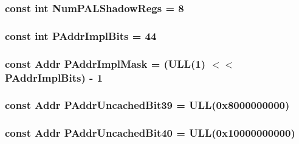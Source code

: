 \label{namespaceAlphaISA_a568d4aa96dd7cd963f3b1b1b0446c9c6}
\hypertarget{namespaceAlphaISA_a28eb16586861c2678813557695525732}{
\subsubsection[{NumPALShadowRegs}]{\setlength{\rightskip}{0pt plus 5cm}const int {\bf NumPALShadowRegs} = 8}}
\label{namespaceAlphaISA_a28eb16586861c2678813557695525732}
\hypertarget{namespaceAlphaISA_a524d6a2c6c70550904ff8fbcd015d6ec}{
\subsubsection[{PAddrImplBits}]{\setlength{\rightskip}{0pt plus 5cm}const int {\bf PAddrImplBits} = 44}}
\label{namespaceAlphaISA_a524d6a2c6c70550904ff8fbcd015d6ec}
\hypertarget{namespaceAlphaISA_abb8b7685b079953e35015543262458e2}{
\subsubsection[{PAddrImplMask}]{\setlength{\rightskip}{0pt plus 5cm}const {\bf Addr} {\bf PAddrImplMask} = (ULL(1) $<$$<$ {\bf PAddrImplBits}) -\/ 1}}
\label{namespaceAlphaISA_abb8b7685b079953e35015543262458e2}
\hypertarget{namespaceAlphaISA_ac10235dc75b856834b31439d8e250374}{
\subsubsection[{PAddrUncachedBit39}]{\setlength{\rightskip}{0pt plus 5cm}const {\bf Addr} {\bf PAddrUncachedBit39} = ULL(0x8000000000)}}
\label{namespaceAlphaISA_ac10235dc75b856834b31439d8e250374}
\hypertarget{namespaceAlphaISA_a49418c464b9c2fec6cdcbd0bc558d14c}{
\subsubsection[{PAddrUncachedBit40}]{\setlength{\rightskip}{0pt plus 5cm}const {\bf Addr} {\bf PAddrUncachedBit40} = ULL(0x10000000000)}}
